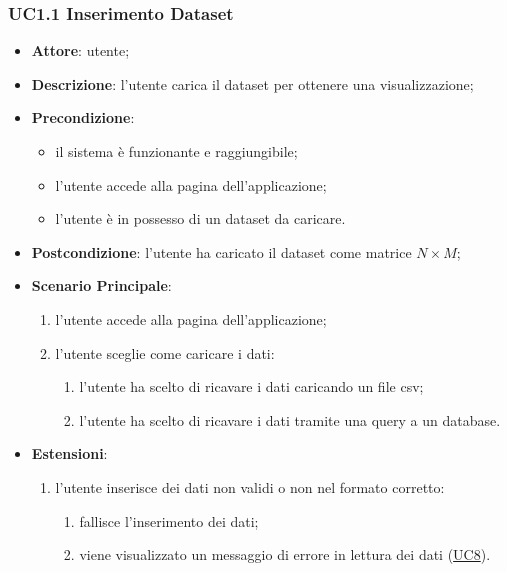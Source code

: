     \subsubsection{UC1.1 Inserimento Dataset}
    \label{uc1.1}
    \begin{itemize}
    
    \item \textbf{Attore}: utente;
    \item \textbf{Descrizione}: l'utente carica il dataset per ottenere una visualizzazione;
    \item \textbf{Precondizione}:
    \begin{itemize}
        \item il sistema è funzionante e raggiungibile;
        \item l'utente accede alla pagina dell'applicazione;
        \item l'utente è in possesso di un dataset da caricare.
    \end{itemize}
    \item \textbf{Postcondizione}: l'utente ha caricato il dataset come matrice $N\times M$;
    \item \textbf{Scenario Principale}: 
        \begin{enumerate}
            \item l'utente accede alla pagina dell'applicazione;
            \item l'utente sceglie come caricare i dati:
                \begin{enumerate}
                    \item l'utente ha scelto di ricavare i dati caricando un file csv;
                    \item l'utente ha scelto di ricavare i dati tramite una query a un database.
                \end{enumerate}
        \end{enumerate}  
    \item \textbf{Estensioni}:
        \begin{enumerate}
            \item l'utente inserisce dei dati non validi o non nel formato corretto:
                \begin{enumerate}
                    \item fallisce l'inserimento dei dati;
                    \item viene visualizzato un messaggio di errore in lettura dei dati (\hyperref[uc8]{UC8}).
                \end{enumerate}

\end{enumerate}
\end{itemize}
